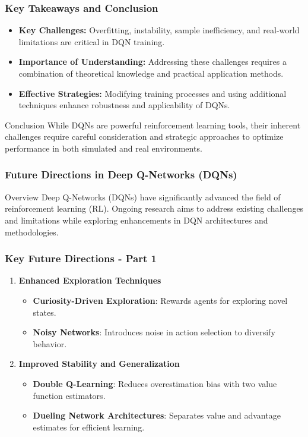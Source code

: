 \documentclass[aspectratio=169]{beamer}
\begin{document}
\begin{frame}[fragile]
    \frametitle{Key Takeaways and Conclusion}

    \begin{itemize}
        \item \textbf{Key Challenges:} Overfitting, instability, sample inefficiency, and real-world limitations are critical in DQN training.
        \item \textbf{Importance of Understanding:} Addressing these challenges requires a combination of theoretical knowledge and practical application methods.
        \item \textbf{Effective Strategies:} Modifying training processes and using additional techniques enhance robustness and applicability of DQNs.
    \end{itemize}

    \begin{block}{Conclusion}
        While DQNs are powerful reinforcement learning tools, their inherent challenges require careful consideration and strategic approaches to optimize performance in both simulated and real environments.
    \end{block}
\end{frame}

\begin{frame}[fragile]
    \frametitle{Future Directions in Deep Q-Networks (DQNs)}
    \begin{block}{Overview}
        Deep Q-Networks (DQNs) have significantly advanced the field of reinforcement learning (RL). Ongoing research aims to address existing challenges and limitations while exploring enhancements in DQN architectures and methodologies.
    \end{block}
\end{frame}

\begin{frame}[fragile]
    \frametitle{Key Future Directions - Part 1}
    \begin{enumerate}
        \item \textbf{Enhanced Exploration Techniques}
        \begin{itemize}
            \item \textbf{Curiosity-Driven Exploration}: Rewards agents for exploring novel states.
            \item \textbf{Noisy Networks}: Introduces noise in action selection to diversify behavior.
        \end{itemize}
        \item \textbf{Improved Stability and Generalization}
        \begin{itemize}
            \item \textbf{Double Q-Learning}: Reduces overestimation bias with two value function estimators.
            \item \textbf{Dueling Network Architectures}: Separates value and advantage estimates for efficient learning.
        \end{itemize}
    \end{enumerate}
\end{frame}
\end{document}
